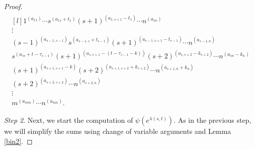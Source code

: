 \documentclass[ALCO,Unicode]{cedram}
\numberwithin{equation}{section}
\begin{document}
\begin{proof}
\begin{align}
		\begin{matrix*}[l]
		1^{(a_{11})} \cdots s^{(a_{1s}+t_{1})}(s+1)^{(a_{1,s+1}-t_1)} \cdots n^{(a_{1n})} \\
		\vdots \\ 
		(s-1)^{(a_{s-1,s-1})}s^{(a_{s-1,s}+t_{s-1})}(s+1)^{(a_{s-1,s+1}-t_{s-1})} \cdots n^{(a_{s-1,n})} \\
		s^{(a_{ss}+t-\tau_{s-1})}(s+1)^{(a_{s,s+1}-(t-\tau_{s-1}-k))} (s+2)^{(a_{s,s+2}-k_{s+2})}\cdots n^{(a_{sn}-k_n)} \\
		(s+1)^{(a_{s+1,s+1}-k)} (s+2)^{(a_{s+1,s+2}+k_{s+2})}\cdots n^{(a_{s+1,n}+k_n)}\\
		(s+2)^{(a_{s+2,s+2})}\cdots n^{(a_{s+2,n})} \\
		\vdots\\
		m^{(a_{mm})} \cdots n^{(a_{mn})}.  \end{matrix*}
\end{align}

\textit{Step 2}. Next,  we start the computation of $\psi(e^{\lambda(s,t)})$. As in the previous step, we will simplify the sums using change of variable arguments and Lemma \ref{bin2}.


\end{proof}
\end{document}
